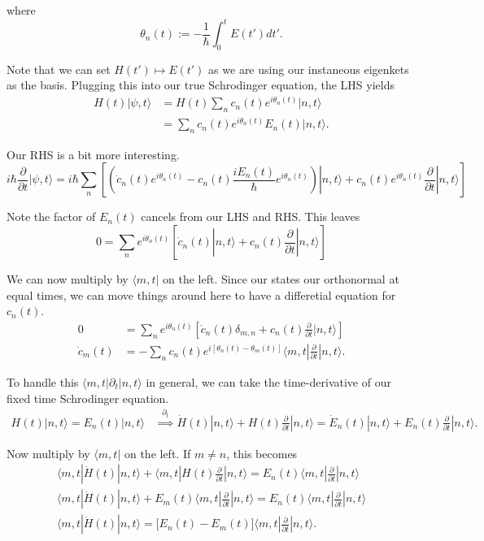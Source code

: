 \documentclass[12pt]{revtex4-2}
\begin{document}
where 
\begin{equation}
    \theta_n(t) := -\frac{1}{\hbar}\int_0^t E(t')dt'.
\end{equation}

Note that we can set $H(t') \mapsto E(t')$ as we are using our instaneous eigenkets as the basis.  Plugging this into our true Schrodinger equation, the LHS yields 
\begin{align}
    H(t)|\psi,t\rangle &= H(t)\sum_n c_n(t)e^{i\theta_n(t)}|n,t\rangle \\
    &= \sum_n c_n(t)e^{i\theta_n(t)}E_n(t)|n,t\rangle.
\end{align}

Our RHS is a bit more interesting.
\begin{equation}
    i\hbar\frac{\partial}{\partial t}|\psi,t\rangle = i\hbar\sum_n\left[\left( \dot{c}_n(t)e^{i\theta_n(t)} - c_n(t)\frac{i E_n(t)}{\hbar}e^{i\theta_n(t)} \right)|n,t\rangle + c_n(t)e^{i\theta_n(t)}\frac{\partial}{\partial t}|n,t\rangle \right]
\end{equation}

Note the factor of $E_n(t)$ cancels from our LHS and RHS.  This leaves
\begin{equation}
    0 = \sum_n e^{i\theta_n(t)}\left[ \dot{c}_n(t)|n,t\rangle + c_n(t)\frac{\partial}{\partial t}|n,t\rangle \right]
\end{equation}

We can now multiply by $\langle m,t|$ on the left.  Since our states our orthonormal at equal times, we can move things around here to have a differetial equation for $c_n(t)$.
\begin{align}
    0 &= \sum_n e^{i\theta_n(t)}\left[ \dot{c}_n(t)\delta_{m,n} + c_n(t)\frac{\partial}{\partial t}|n,t\rangle \right] \\
    \dot{c}_m(t) &= -\sum_n c_n(t)e^{i[\theta_n(t)-\theta_m(t)]} \langle m,t| \frac{\partial}{\partial t} | n,t\rangle.
\end{align}

To handle this $\langle m,t | \partial_t | n,t\rangle$ in general, we can take the time-derivative of our fixed time Schrodinger equation.
\begin{align}
    H(t)|n,t\rangle = E_n(t)|n,t\rangle &\overset{\partial_t}{\implies} \dot{H}(t)|n,t\rangle + H(t)\frac{\partial}{\partial t}|n,t\rangle = \dot{E}_n(t)|n,t\rangle + E_n(t)\frac{\partial}{\partial t}|n,t\rangle.
\end{align}

Now multiply by $\langle m,t|$ on the left.  If $m \neq n$, this becomes 
\begin{gather}
    \langle m,t|\dot{H}(t)|n,t\rangle + \langle m,t|H(t)\frac{\partial}{\partial t}|n,t\rangle = E_n(t)\langle m,t|\frac{\partial}{\partial t}|n,t\rangle \\
    \langle m,t|\dot{H}(t)|n,t\rangle + E_m(t)\langle m,t|\frac{\partial}{\partial t}|n,t\rangle = E_n(t)\langle m,t|\frac{\partial}{\partial t}|n,t\rangle \\
    \langle m,t|\dot{H}(t)|n,t\rangle = \big[ E_n(t) - E_m(t) \big]\langle m,t|\frac{\partial}{\partial t}|n,t\rangle.
\end{gather}
\end{document}
